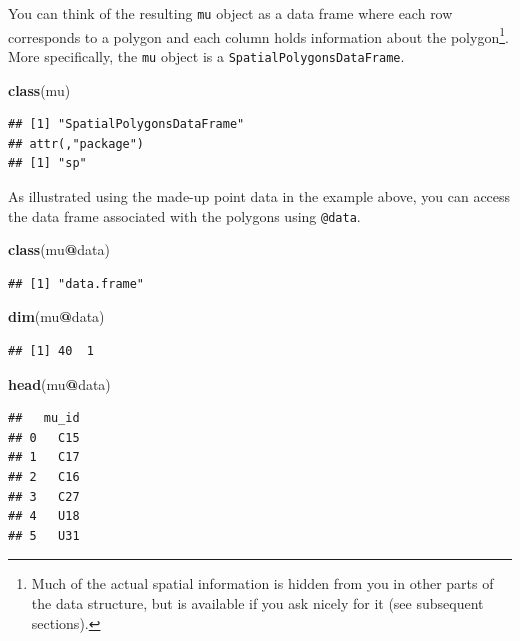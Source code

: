 \documentclass[
]{krantz}
\newenvironment{Shaded}{\begin{snugshade}}{\end{snugshade}}
\newcommand{\KeywordTok}[1]{\textcolor[rgb]{0.13,0.29,0.53}{\textbf{#1}}}
\newcommand{\NormalTok}[1]{#1}
\newcommand{\OperatorTok}[1]{\textcolor[rgb]{0.81,0.36,0.00}{\textbf{#1}}}
\begin{document}
You can think of the resulting \texttt{mu} object as a data frame where each row corresponds to a polygon and each column holds information about the polygon\footnote{Much of the actual spatial information is hidden from you in other parts of the data structure, but is available if you ask nicely for it (see subsequent sections).}. More specifically, the \texttt{mu} object is a \texttt{SpatialPolygonsDataFrame}.

\begin{Shaded}
\begin{Highlighting}[]
\KeywordTok{class}\NormalTok{(mu)}
\end{Highlighting}
\end{Shaded}

\begin{verbatim}
## [1] "SpatialPolygonsDataFrame"
## attr(,"package")
## [1] "sp"
\end{verbatim}

As illustrated using the made-up point data in the example above, you can access the data frame associated with the polygons using \texttt{@data}.

\begin{Shaded}
\begin{Highlighting}[]
\KeywordTok{class}\NormalTok{(mu}\OperatorTok{@}\NormalTok{data)}
\end{Highlighting}
\end{Shaded}

\begin{verbatim}
## [1] "data.frame"
\end{verbatim}

\begin{Shaded}
\begin{Highlighting}[]
\KeywordTok{dim}\NormalTok{(mu}\OperatorTok{@}\NormalTok{data)}
\end{Highlighting}
\end{Shaded}

\begin{verbatim}
## [1] 40  1
\end{verbatim}

\begin{Shaded}
\begin{Highlighting}[]
\KeywordTok{head}\NormalTok{(mu}\OperatorTok{@}\NormalTok{data)}
\end{Highlighting}
\end{Shaded}

\begin{verbatim}
##   mu_id
## 0   C15
## 1   C17
## 2   C16
## 3   C27
## 4   U18
## 5   U31
\end{verbatim}
\end{document}
